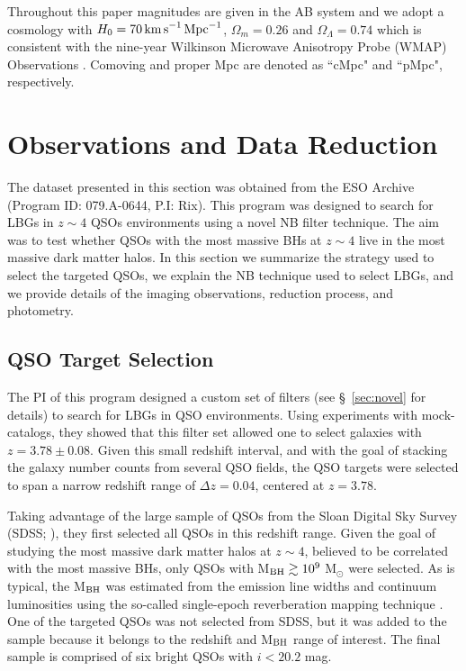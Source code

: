 \documentclass[iop, revtex4]{emulateapj}
\begin{document}
Throughout this paper magnitudes are given in the AB system
\citep{Oke74,Fukugita95} and we adopt a cosmology with $H_{0}=70\,{\rm
  km\,s}^{-1}\,{\rm Mpc}^{-1}$, $\Omega_{m}=0.26$ and
$\Omega_{\Lambda}=0.74$ which is consistent with the nine-year
Wilkinson Microwave Anisotropy Probe (WMAP) Observations
\citep{Hinshaw13}. Comoving and proper Mpc are denoted as ``cMpc" and
``pMpc", respectively.

\section{Observations and Data Reduction} 
\label{sec:data}

The dataset presented in this section was obtained from the ESO
Archive (Program ID: 079.A-0644, P.I: Rix).  This program was designed
to search for LBGs in $z\sim4$ QSOs environments
using a novel NB filter technique. The aim was to test whether QSOs
with the most massive BHs at $z\sim4$
live in the most massive dark matter halos. In this section we
summarize the strategy used to select the targeted QSOs, we explain
the NB technique used to select LBGs, and we provide details of
the imaging observations, reduction process, and photometry.

\subsection{QSO Target Selection} 
\label{sec:qso_selec}

The PI of this program designed a custom set of filters (see
\S~\ref{sec:novel} for details) to search for LBGs in QSO
environments. Using experiments with mock-catalogs, they showed that
this filter set allowed one to select galaxies with $z=3.78\pm0.08$. Given
this small redshift interval,  and with the goal of stacking the
galaxy number counts from several QSO fields, the QSO targets were
selected to span a narrow redshift range of $\Delta z=0.04$, centered
at $z=3.78$.

Taking advantage of the large sample of QSOs from the Sloan Digital
Sky Survey (SDSS; \citealt{York00}), they first selected all QSOs in
this redshift range. Given the goal of studying the most massive dark
matter halos at $z\sim4$, believed to be correlated with the most
massive BHs, only QSOs with M$_{\rm BH}\gtrsim10^{9}$
M$_{\odot}$ were selected. As is typical, the M$_{\rm BH}$ was
estimated from the emission line widths and continuum luminosities
using the so-called single-epoch reverberation mapping technique
\citep{Vestergaard02}. One of the targeted QSOs was not selected from SDSS, 
but it was added to the sample because it belongs to the redshift and M$_{\rm BH}$ 
range of interest. The final sample is comprised of six bright QSOs
with $i<20.2$ mag. 
\end{document}
